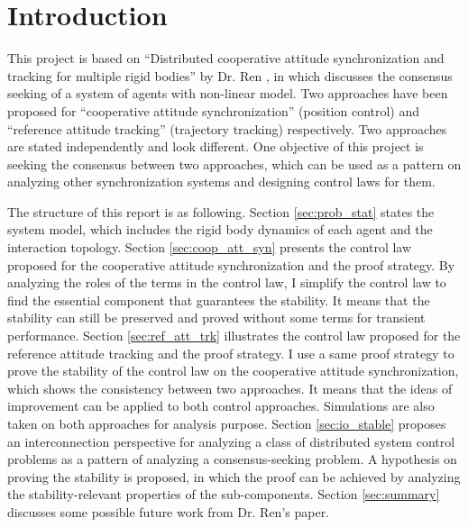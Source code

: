 \section{Introduction}
\label{sec:intro}

This project is based on ``Distributed cooperative attitude synchronization and tracking for multiple rigid bodies'' by Dr. Ren \cite{5229134}, in which discusses the consensus seeking of a system of agents with non-linear model.
Two approaches have been proposed for ``cooperative attitude synchronization'' (position control) and ``reference attitude tracking'' (trajectory tracking) respectively.
Two approaches are stated independently and look different.
One objective of this project is seeking the consensus between two approaches, which can be used as a pattern on analyzing other synchronization systems and designing control laws for them.

The structure of this report is as following.
Section \ref{sec:prob_stat} states the system model, which includes the rigid body dynamics of each agent and the interaction topology.
Section \ref{sec:coop_att_syn} presents the control law proposed for the cooperative attitude synchronization and the proof strategy.
By analyzing the roles of the terms in the control law, I simplify the control law to find the essential component that guarantees the stability.
It means that the stability can still be preserved and proved without some terms for transient performance.
Section \ref{sec:ref_att_trk} illustrates the control law proposed for the reference attitude tracking and the proof strategy.
I use a same proof strategy to prove the stability of the control law on the cooperative attitude synchronization, which shows the consistency between two approaches.
It means that the ideas of improvement can be applied to both control approaches.
Simulations are also taken on both approaches for analysis purpose.
Section \ref{sec:io_stable} proposes an interconnection perspective for analyzing a class of distributed system control problems as a pattern of analyzing a consensus-seeking problem.
A hypothesis on proving the stability is proposed, in which the proof can be achieved by analyzing the stability-relevant properties of the sub-components.
Section \ref{sec:summary} discusses some possible future work from Dr. Ren's paper.